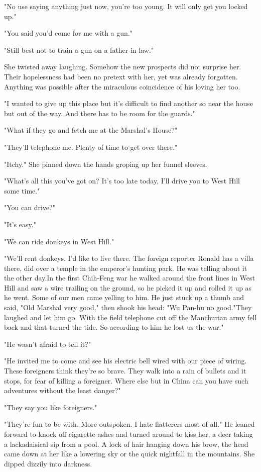 \par "No use saying anything just now, you're too young. It will only get you locked up."
\par "You said you'd come for me with a gun."
\par "Still best not to train a gun on a father-in-law."
\par She twisted away laughing. Somehow the new prospects did not surprise her. Their hopelessness had been no pretext with her, yet was already forgotten. Anything was possible after the miraculous coincidence of his loving her too.
\par "I wanted to give up this place but it's difficult to find another so near the house but out of the way. And there has to be room for the guards."
\par "What if they go and fetch me at the Marshal's House?"
\par "They'll telephone me. Plenty of time to get over there."
\par "Itchy." She pinned down the hands groping up her funnel sleeves.
\par "What's all this you've got on? It's too late today, I'll drive you to West Hill some time."
\par "You can drive?"
\par "It's easy."
\par "We can ride donkeys in West Hill."
\par "We'll rent donkeys. I'd like to live there. The foreign reporter Ronald has a villa there, did over a temple in the emperor's hunting park. He was telling about it the other day.In the first Chih-Feng war he walked around the front lines in West Hill and saw a wire trailing on the ground, so he picked it up and rolled it up as he went. Some of our men came yelling to him. He just stuck up a thumb and said, "Old Marshal very good," then shook his head: "Wu Pan-hu no good."They laughed and let him go. With the field telephone cut off the Manchurian army fell back and that turned the tide. So according to him he lost us the war."
\par "He wasn't afraid to tell it?"
\par "He invited me to come and see his electric bell wired with our piece of wiring. These foreigners think they're so brave. They walk into a rain of bullets and it stops, for fear of killing a foreigner. Where else but in China can you have such adventures without the least danger?"
\par "They say you like foreigners."
\par "They're fun to be with. More outspoken. I hate flatterers most of all." He leaned forward to knock off cigarette ashes and turned around to kiss her, a deer taking a lackadaisical sip from a pool. A lock of hair hanging down his brow, the head came down at her like a lowering sky or the quick nightfall in the mountains. She dipped dizzily into darkness.

